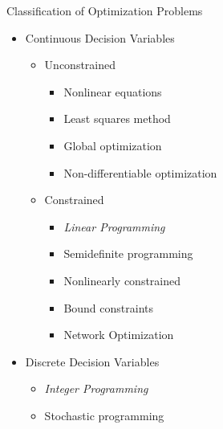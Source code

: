 \documentclass[
    NAME={Dr. Helga Ingimundardóttir},
    EMAIL={helgaingim@hi.is},
    FACULTY={Industrial Engineering},
    TITLE={Linear Optimization},
    SUBTITLE={Fundamentals and Applications},
    SEMINAR={VÉL113F},
    DATE={Design and Optimization}
]{HI-latex/hi-beamer}
\begin{document}
    \begin{frame}[allowframebreaks]{Classification of Optimization Problems}
        \begin{itemize}
            \item Continuous Decision Variables
            \begin{itemize}
                \item Unconstrained
                \begin{itemize}
                    \item Nonlinear equations
                    \item Least squares method
                    \item Global optimization
                    \item Non-differentiable optimization
                \end{itemize}
                \item Constrained
                \begin{itemize}
                    \item \emph{Linear Programming}
                    \item Semidefinite programming
                    \item Nonlinearly constrained
                    \item Bound constraints
                    \item Network Optimization
                \end{itemize}
            \end{itemize}
            \item Discrete Decision Variables
            \begin{itemize}
                \item \emph{Integer Programming}
                \item Stochastic programming
            \end{itemize}
        \end{itemize}
    \end{frame}
\end{document}
